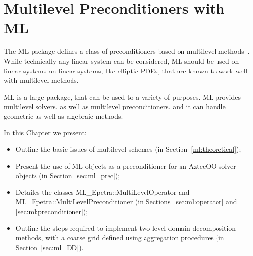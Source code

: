 % 
% 
% 
%  
%  
% 

\section{Multilevel Preconditioners with ML}
\label{chap:ml}

The ML package defines a class of preconditioners based on multilevel
methods~\cite{TuminaroTong:00a}. While technically any linear system can
be considered, ML should be used on linear systems on linear systems,
like elliptic PDEs, that are known to work well with multilevel methods.

ML is a large package, that can be used to a variety of purposes. ML
provides multilevel solvers, as well as multilevel preconditioners, and
it can handle geometric as well as algebraic methods.

In this Chapter we present:
\begin{itemize}
\item Outline the basic issues of multilevel schemes (in
  Section~\ref{ml:theoretical});
\item Present the use of ML objects as a preconditioner for an AztecOO
  solver objects (in Section~\ref{sec:ml_prec});
\item Detailes the classes ML\_Epetra::MultiLevelOperator and
  ML\_Epetra::MultiLevelPreconditioner (in
  Sections~\ref{sec:ml:operator} and \ref{sec:ml:preconditioner});
\item Outline the steps required to implement two-level domain
  decomposition methods, with a coarse grid defined using aggregation
  procedures (in Section~\ref{sec:ml_DD}).
\end{itemize}

